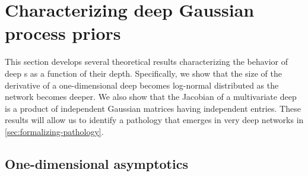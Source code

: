 \section{Characterizing deep Gaussian process priors}
\label{sec:characterizing-deep-gps}

This section develops several theoretical results characterizing the behavior of deep \gp{}s as a function of their depth.
Specifically, we show that the size of the derivative of a one-dimensional deep \gp{} becomes log-normal distributed as the network becomes deeper.
We also show that the Jacobian of a multivariate deep \gp{} is a product of independent Gaussian matrices having independent entries.
These results will allow us to identify a pathology that emerges in very deep networks in \cref{sec:formalizing-pathology}.


\subsection{One-dimensional asymptotics}
\label{sec:1d}


